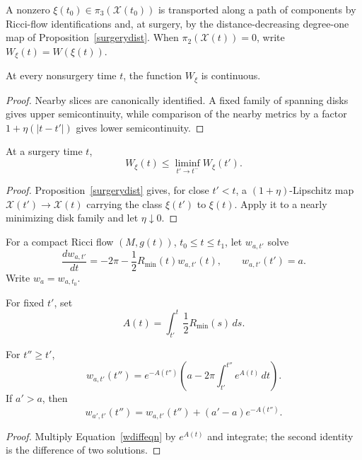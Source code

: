 A nonzero $\xi(t_0)\in\pi_3({\mathcal X}(t_0))$ is transported along a path
of components by Ricci-flow identifications and, at surgery, by the
distance-decreasing degree-one map of Proposition~\ref{surgerydist}. When
$\pi_2({\mathcal X}(t))=0$, write $W_\xi(t)=W(\xi(t))$.

\begin{claim}
\label{claim:w-xi-continuity-nonsurgery}
At every nonsurgery time $t$, the function $W_\xi$ is continuous.
\end{claim}
\begin{proof}
\sketch Nearby slices are canonically identified. A fixed family of spanning
disks gives upper semicontinuity, while comparison of the nearby metrics by a
factor $1+\eta(|t-t'|)$ gives lower semicontinuity.
\end{proof}

\begin{claim}
\label{claim:w-xi-surgery-semicontinuity}
At a surgery time $t$,
\[
W_\xi(t)\le\liminf_{t'\to t^-}W_\xi(t').
\]
\end{claim}
\begin{proof}
\sketch Proposition~\ref{surgerydist} gives, for close $t'<t$, a
$(1+\eta)$-Lipschitz map ${\mathcal X}(t')\to{\mathcal X}(t)$ carrying the
class $\xi(t')$ to $\xi(t)$. Apply it to a nearly minimizing disk family and
let $\eta\downarrow0$.
\end{proof}

\begin{definition}
\label{def:w-a-t-ode-solution}
For a compact Ricci flow $(M,g(t))$, $t_0\le t\le t_1$, let $w_{a,t'}$ solve
\begin{equation}\label{wdiffeqn}
\frac{dw_{a,t'}}{dt}=-2\pi-\frac12R_{\min}(t)w_{a,t'}(t),
\qquad w_{a,t'}(t')=a.
\end{equation}
Write $w_a=w_{a,t_0}$.
\end{definition}

\begin{definition}
\label{def:a-function-integral}
For fixed $t'$, set
\[
A(t)=\int_{t'}^t\frac12R_{\min}(s)\,ds.
\]
\end{definition}

\begin{claim}
\label{claim:w-a-t-explicit-formula}
\label{vclaim}
For $t''\ge t'$,
\[
w_{a,t'}(t'')=e^{-A(t'')}
\left(a-2\pi\int_{t'}^{t''}e^{A(t)}\,dt\right).
\]
If $a'>a$, then
\[
w_{a',t'}(t'')=w_{a,t'}(t'')+(a'-a)e^{-A(t'')}.
\]
\end{claim}
\begin{proof}
\sketch Multiply Equation~\eqref{wdiffeqn} by $e^{A(t)}$ and integrate; the
second identity is the difference of two solutions.
\end{proof}

